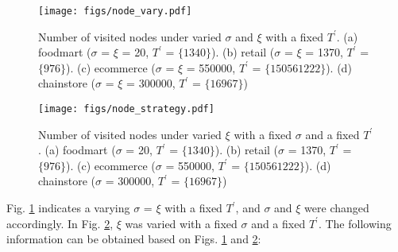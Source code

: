\documentclass[journal]{IEEEtran}
\begin{document}
\begin{figure}[!h]
	\centering
	\texttt{[image: figs/node\_vary.pdf]}
	\caption{Number of visited nodes under varied $\sigma$ and $\xi$ with a fixed $T^\prime$. (a) foodmart ($\sigma$ = $\xi$ = 20, $T^\prime$ = $\{1340\}$). (b) retail ($\sigma$ = $\xi$ = 1370, $T^\prime$ = $\{976\}$). (c) ecommerce ($\sigma$ = $\xi$ = 550000, $T^\prime$ = $\{150561222\}$). (d) chainstore ($\sigma$ = $\xi$ = 300000, $T^\prime$ = $\{16967\}$)}
	\label{fig:nodefixed}
\end{figure}


\begin{figure}[!h]
	\centering
	\texttt{[image: figs/node\_strategy.pdf]}
	\caption{Number of visited nodes under varied $\xi$ with a fixed $\sigma$ and a fixed $T^\prime$. (a) foodmart ($\sigma$ = 20, $T^\prime$ = $\{1340\}$). (b) retail ($\sigma$ = 1370, $T^\prime$ = $\{976\}$). (c) ecommerce ($\sigma$ = 550000, $T^\prime$ = $\{150561222\}$). (d) chainstore ($\sigma$ = 300000, $T^\prime$ = $\{16967\}$)}
	\label{fig:nodestrategy}
\end{figure}



Fig. \ref{fig:nodefixed} indicates a varying $\sigma$ = $\xi$ with a fixed $T^\prime$, and $\sigma$ and $\xi$ were changed accordingly. In Fig. \ref{fig:nodestrategy}, $\xi$ was varied with a fixed $\sigma$ and a fixed $T^\prime$. The following information can be obtained based on Figs. \ref{fig:nodefixed} and \ref{fig:nodestrategy}:
\end{document}
